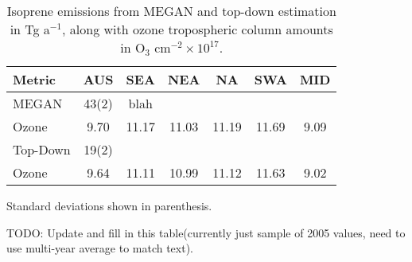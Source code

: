   
  
  \begin{table}\begin{threeparttable}
    \caption{Isoprene emissions from MEGAN and top-down estimation in Tg a$^{-1}$, along with ozone tropospheric column amounts in O$_3$ cm$^{-2} \times 10^{17}$.}
    \begin{tabular}{ l c c c c c c } 
      \toprule
      Metric & AUS & SEA & NEA & NA & SWA & MID \\
      \midrule
      MEGAN & 43(2) & blah &  &  & & \\
      Ozone & 9.70 & 11.17 & 11.03 & 11.19 & 11.69 & 9.09 \\
      \midrule
      Top-Down & 19(2) & & & & & \\
      Ozone & 9.64 & 11.11 & 10.99 & 11.12 & 11.63 & 9.02 \\
      \bottomrule
    \end{tabular}
    \begin{tablenotes}
      \item Standard deviations shown in parenthesis.
      \item TODO: Update and fill in this table(currently just sample of 2005 values, need to use multi-year average to match text).
    \end{tablenotes}
    \label{Conclusions:ozone:tab_emissions_vs_ozone}
  \end{threeparttable}\end{table}
  
  

